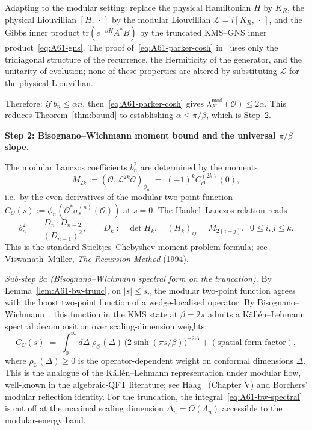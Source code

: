 \documentclass[12pt,a4paper]{article}
\begin{document}
Adapting to the modular setting: replace the physical Hamiltonian $H$
by $K_R$, the physical Liouvillian $[H,\,\cdot\,]$ by the modular
Liouvillian $\mathcal{L} = i[K_R,\,\cdot\,]$, and the Gibbs inner
product $\mathrm{tr}(e^{-\beta H} A^* B)$ by the truncated KMS--GNS inner
product~\eqref{eq:A61-gns}. The proof of~\eqref{eq:A61-parker-cosh}
in~\cite{Parker2019} uses only the tridiagonal structure of the
recurrence, the Hermiticity of the generator, and the unitarity of
evolution; none of these properties are altered by substituting
$\mathcal{L}$ for the physical Liouvillian.

Therefore: \emph{if} $b_n \le \alpha n$, then~\eqref{eq:A61-parker-cosh}
gives $\lambda_K^{\mathrm{mod}}(\mathcal{O}) \le 2\alpha$.
This reduces Theorem~\ref{thm:bound} to establishing
$\alpha \le \pi/\beta$, which is Step~2.

\medskip

\noindent\textbf{Step 2: Bisognano--Wichmann moment bound and the
universal $\pi/\beta$ slope.}

The modular Lanczos coefficients $b_n^2$ are determined by the moments
\begin{equation}
  M_{2k} := (\mathcal{O}, \mathcal{L}^{2k}\mathcal{O})_{\phi_n}
  \;=\; (-1)^k C_\mathcal{O}^{(2k)}(0),
  \label{eq:A61-moments}
\end{equation}
i.e.\ by the even derivatives of the modular two-point function
$C_\mathcal{O}(s) := \phi_n(\mathcal{O}^* \sigma_s^{(n)}(\mathcal{O}))$
at $s=0$. The Hankel--Lanczos relation reads
\begin{equation}
  b_n^2 \;=\;
  \frac{D_n \cdot D_{n-2}}{(D_{n-1})^2},
  \qquad
  D_k := \det H_k,\quad
  (H_k)_{ij} = M_{2(i+j)},\;\; 0 \le i,j \le k.
  \label{eq:A61-hankel}
\end{equation}
This is the standard Stieltjes--Chebyshev moment-problem formula;
see Viswanath--M\"{u}ller, \emph{The Recursion Method} (1994).

\emph{Sub-step 2a (Bisognano--Wichmann spectral form on the truncation).}
By Lemma~\ref{lem:A61-bw-trunc}, on $|s|\le s_n$ the modular
two-point function agrees with the boost two-point function of a
wedge-localised operator. By Bisognano--Wichmann~\cite{BisognanoWichmann1976},
this function in the KMS state at $\beta = 2\pi$ admits a K\"{a}ll\'{e}n--Lehmann
spectral decomposition over scaling-dimension weights:
\begin{equation}
  C_\mathcal{O}(s)
  \;=\;
  \int_0^\infty \!d\Delta\;\rho_\mathcal{O}(\Delta)
  \,\bigl(2\sinh(\pi s/\beta)\bigr)^{-2\Delta}
  + (\text{spatial form factor}),
  \label{eq:A61-bw-spectral}
\end{equation}
where $\rho_\mathcal{O}(\Delta) \ge 0$ is the operator-dependent
weight on conformal dimensions $\Delta$. This is the analogue of the
K\"{a}ll\'{e}n--Lehmann representation under modular flow, well-known in
the algebraic-QFT literature; see Haag~\cite{Haag1996} (Chapter V)
and Borchers' modular reflection identity.
For the truncation, the integral~\eqref{eq:A61-bw-spectral} is cut off
at the maximal scaling dimension $\Delta_n = O(\Lambda_n)$ accessible
to the modular-energy band.
\end{document}
